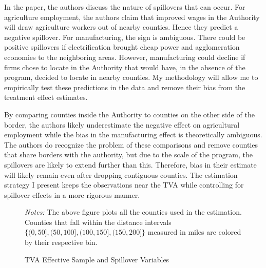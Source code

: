 \documentclass[11pt]{article}
\begin{document}
In the paper, the authors discuss the nature of spillovers that can occur. For agriculture employment, the authors claim that improved wages in the Authority will draw agriculture workers out of nearby counties. Hence they predict a negative spillover. For manufacturing, the sign is ambiguous. There could be positive spillovers if electrification brought cheap power and agglomeration economies to the neighboring areas. However, manufacturing could decline if firms chose to locate in the Authority that would have, in the absence of the program, decided to locate in nearby counties. My methodology will allow me to empirically test these predictions in the data and remove their bias from the treatment effect estimates. 

By comparing counties inside the Authority to counties on the other side of the border, the authors likely underestimate the negative effect on agricultural employment while the bias in the manufacturing effect is theoretically ambiguous. The authors do recognize the problem of these comparisons and remove counties that share borders with the authority, but due to the scale of the program, the spillovers are likely to extend further than this. Therefore, bias in their estimate will likely remain even after dropping contiguous counties. The estimation strategy I present keeps the observations near the TVA while controlling for spillover effects in a more rigorous manner.  

\begin{figure}[tb!]
    \caption{TVA Effective Sample and Spillover Variables}
    \label{fig:tva_sample}

    {\centering
    }
    {\footnotesize \textit{Notes:} The above figure plots all the counties used in the estimation. Counties that fall within the distance intervals $\{ (0, 50], (50, 100], (100, 150], (150, 200] \}$ measured in miles are colored by their respective bin.} 
\end{figure}
\end{document}
